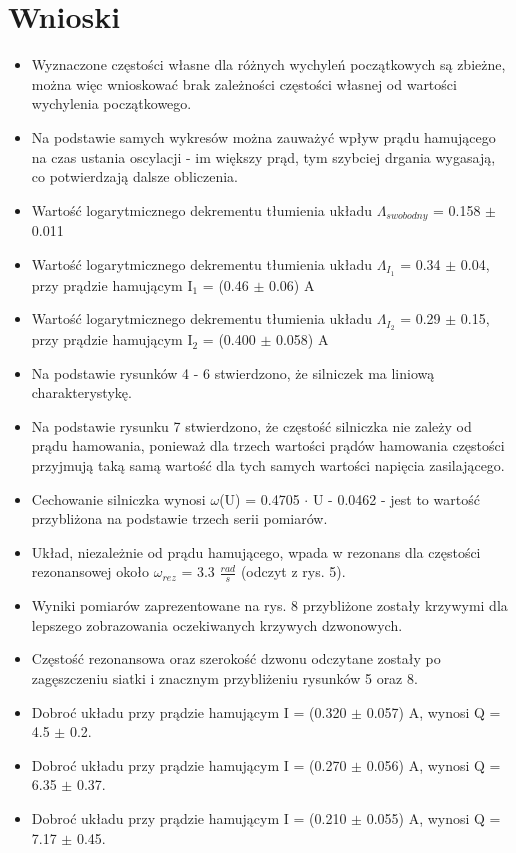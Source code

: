 \documentclass[12pt, a4paper, oneside]{article}
\begin{document}
\section{Wnioski}
\begin{itemize}
\item Wyznaczone częstości własne dla różnych wychyleń początkowych są zbieżne, można więc wnioskować brak zależności częstości własnej od wartości wychylenia początkowego.
\item Na podstawie samych wykresów można zauważyć wpływ prądu hamującego na czas ustania oscylacji - im większy prąd, tym szybciej drgania wygasają, co potwierdzają dalsze obliczenia.
\item Wartość logarytmicznego dekrementu tłumienia układu $\Lambda_{swobodny}$ = 0.158 $\pm$ 0.011
\item Wartość logarytmicznego dekrementu tłumienia układu $\Lambda_{I_1}$ = 0.34 $\pm$ 0.04, przy prądzie hamującym I$_1$ = (0.46 $\pm$ 0.06) A
\item Wartość logarytmicznego dekrementu tłumienia układu $\Lambda_{I_2}$ = 0.29 $\pm$ 0.15, przy prądzie hamującym I$_2$ = (0.400 $\pm$ 0.058) A
\item Na podstawie rysunków 4 - 6 stwierdzono, że silniczek ma liniową charakterystykę.
\item Na podstawie rysunku 7 stwierdzono, że częstość silniczka nie zależy od prądu hamowania, ponieważ dla trzech wartości prądów hamowania częstości przyjmują taką samą wartość dla tych samych wartości napięcia zasilającego.
\item Cechowanie silniczka wynosi $\omega$(U) = 0.4705 $\cdot$ U - 0.0462 - jest to wartość przybliżona na podstawie trzech serii pomiarów.
\item Układ, niezależnie od prądu hamującego, wpada w rezonans dla częstości rezonansowej około $\omega_{rez}$ = 3.3 $\frac{rad}{s}$ (odczyt z rys. 5).
\item Wyniki pomiarów zaprezentowane na rys. 8 przybliżone zostały krzywymi dla lepszego zobrazowania oczekiwanych krzywych dzwonowych.
\item Częstość rezonansowa oraz szerokość dzwonu odczytane zostały po zagęszczeniu siatki i znacznym przybliżeniu rysunków 5 oraz 8.
\item Dobroć układu przy prądzie hamującym I = (0.320 $\pm$ 0.057) A, wynosi Q = 4.5 $\pm$ 0.2.
\item Dobroć układu przy prądzie hamującym I = (0.270 $\pm$ 0.056) A, wynosi Q = 6.35 $\pm$ 0.37.
\item Dobroć układu przy prądzie hamującym I = (0.210 $\pm$ 0.055) A, wynosi Q = 7.17 $\pm$ 0.45.
\end{itemize}
\end{document}
